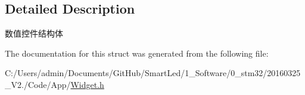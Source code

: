 \subsection{\-Detailed \-Description}
数值控件结构体 

\-The documentation for this struct was generated from the following file\-:\begin{DoxyCompactItemize}
\item 
\-C\-:/\-Users/admin/\-Documents/\-Git\-Hub/\-Smart\-Led/1\-\_\-\-Software/0\-\_\-stm32/20160325\-\_\-\-V2./\-Code/\-App/\hyperlink{_widget_8h}{\-Widget.\-h}\end{DoxyCompactItemize}
